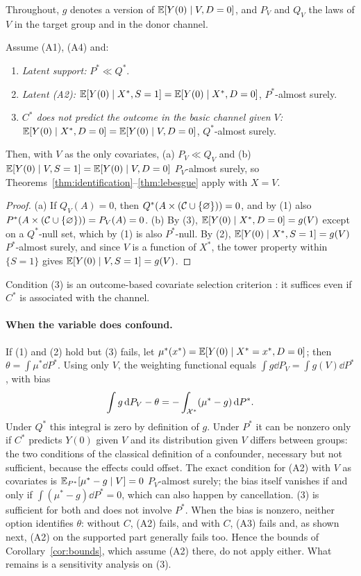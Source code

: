 Throughout, $g$ denotes a version of $\mathbb{E}[Y(0)\mid V,D=0]$, and $P_V$ and $Q_V$ the laws of $V$ in the target group and in the donor channel.

\begin{proposition}\label{prop:drop}
Assume (A1), (A4) and:
\begin{enumerate}
  \item \emph{Latent support:} $P^*\ll Q^*$.
  \item \emph{Latent (A2):} $\mathbb{E}[Y(0)\mid X^*,S=1]=\mathbb{E}[Y(0)\mid X^*,D=0]$, $P^*$-almost surely.
  \item \emph{$C^*$ does not predict the outcome in the basic channel given $V$:} $\mathbb{E}[Y(0)\mid X^*,D=0]=\mathbb{E}[Y(0)\mid V,D=0]$, $Q^*$-almost surely.
\end{enumerate}
Then, with $V$ as the only covariates, (a) $P_V\ll Q_V$ and (b) $\mathbb{E}[Y(0)\mid V,S=1]=\mathbb{E}[Y(0)\mid V,D=0]$ $P_V$-almost surely, so Theorems~\ref{thm:identification}--\ref{thm:lebesgue} apply with $X=V$.
\end{proposition}
\begin{proof}
(a) If $Q_V(A)=0$, then $Q^*(A\times(\mathcal C\cup\{\varnothing\}))=0$, and by (1) also $P^*(A\times(\mathcal C\cup\{\varnothing\}))=P_V(A)=0$.
(b) By (3), $\mathbb{E}[Y(0)\mid X^*,D=0]=g(V)$ except on a $Q^*$-null set, which by (1) is also $P^*$-null. By (2), $\mathbb{E}[Y(0)\mid X^*,S=1]=g(V)$ $P^*$-almost surely, and since $V$ is a function of $X^*$, the tower property within $\{S=1\}$ gives $\mathbb{E}[Y(0)\mid V,S=1]=g(V)$.
\end{proof}

Condition (3) is an outcome-based covariate selection criterion \citep{deluna2011}: it suffices even if $C^*$ is associated with the channel.

\paragraph{When the variable does confound.} If (1) and (2) hold but (3) fails, let $\mu^*(x^*)=\mathbb{E}[Y(0)\mid X^*=x^*,D=0]$; then $\theta=\int\mu^*\dd P^*$. Using only $V$, the weighting functional equals $\int g\dd P_V=\int g(V)\dd P^*$, with bias
\[
\int g\,\mathrm{d} P_V-\theta=-\int_{\mathcal{X}^*}(\mu^*-g)\,\mathrm{d} P^*.
\]
Under $Q^*$ this integral is zero by definition of $g$. Under $P^*$ it can be nonzero only if $C^*$ predicts $Y(0)$ given $V$ and its distribution given $V$ differs between groups: the two conditions of the classical definition of a confounder, necessary but not sufficient, because the effects could offset. The exact condition for (A2) with $V$ as covariates is $\mathbb{E}_{P^*}[\mu^*-g\mid V]=0$ $P_V$-almost surely; the bias itself vanishes if and only if $\int(\mu^*-g)\dd P^*=0$, which can also happen by cancellation. (3) is sufficient for both and does not involve $P^*$. When the bias is nonzero, neither option identifies $\theta$: without $C$, (A2) fails, and with $C$, (A3) fails and, as shown next, (A2) on the supported part generally fails too. Hence the bounds of Corollary~\ref{cor:bounds}, which assume (A2) there, do not apply either. What remains is a sensitivity analysis on (3).

